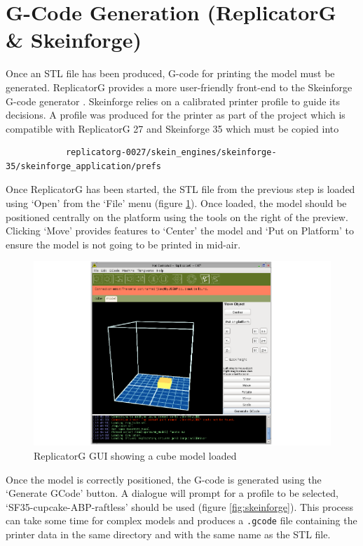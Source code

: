 	\section{G-Code Generation (ReplicatorG \& Skeinforge)}
		
		Once an STL file has been produced, G-code for printing the model must be
		generated. ReplicatorG provides a more user-friendly front-end to the
		Skeinforge G-code generator \cite{replicatorg}. Skeinforge relies on a
		calibrated printer profile to guide its decisions. A profile was produced
		for the printer as part of the project which is compatible with ReplicatorG
		27 and Skeinforge 35 which must be copied into
		\begin{verbatim}
			replicatorg-0027/skein_engines/skeinforge-35/skeinforge_application/prefs
		\end{verbatim}
		
		Once ReplicatorG has been started, the STL file from the previous step is
		loaded using `Open' from the `File' menu (figure \ref{fig:replicatorG}).
		Once loaded, the model should be positioned centrally on the platform using
		the tools on the right of the preview. Clicking `Move' provides features to
		`Center' the model and `Put on Platform' to ensure the model is not going to
		be printed in mid-air.
		
		\begin{figure}
			\includegraphics[width=1\textwidth]{diagrams/replicatorG.pdf}
			\caption{ReplicatorG GUI showing a cube model loaded}
			\label{fig:replicatorG}
		\end{figure}
		
		Once the model is correctly positioned, the G-code is generated using the
		`Generate GCode' button. A dialogue will prompt for a profile to be
		selected, `SF35-cupcake-ABP-raftless' should be used (figure
		\ref{fig:skeinforge}). This process can take some time for complex models
		and produces a \verb|.gcode| file containing the printer data in the same
		directory and with the same name as the STL file.
		
